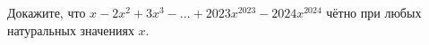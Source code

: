 Докажите, что \(x - 2x^2 + 3x^3 - ... + 2023x^{2023} - 2024x^{2024}\) чётно при любых натуральных значениях \(x\).
